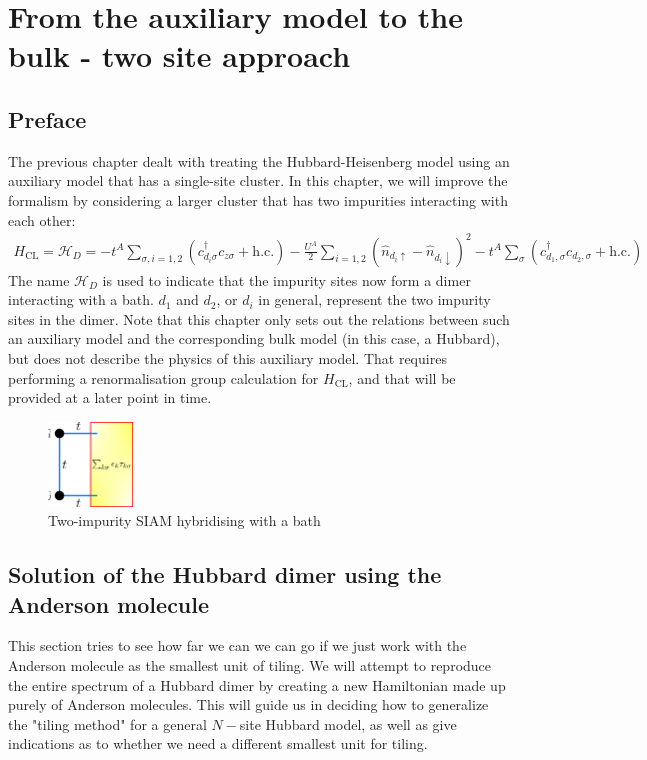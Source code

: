 \documentclass{report}
\numberwithin{equation}{section}
\begin{document}
\chapter{From the auxiliary model to the bulk - two site approach}

\section{Preface}
The previous chapter dealt with treating the Hubbard-Heisenberg model using an auxiliary model that has a single-site cluster. In this chapter, we will improve the formalism by considering a larger cluster that has two impurities interacting with each other:
\begin{equation}\begin{aligned}
	\label{dimer_ham}
	H_\text{CL} = \mathcal{H}_D = -t^A\sum_{\sigma, i=1,2}\left(c^\dagger_{d_i\sigma}c_{z\sigma} + \text{h.c.}\right) - \frac{U^A}{2}\sum_{i=1,2}\left(\hat n_{d_i \uparrow} - \hat n_{d_i \downarrow}\right)^2 - t^A \sum_\sigma \left(c^\dagger_{d_1,\sigma}c_{d_2,\sigma} + \text{h.c.}\right) 
\end{aligned}\end{equation}
The name \(\mathcal{H}_D\) is used to indicate that the impurity sites now form a dimer interacting with a bath. \(d_1\) and \(d_2\), or \(d_i\) in general, represent the two impurity sites in the dimer. Note that this chapter only sets out the relations between such an auxiliary model and the corresponding bulk model (in this case, a Hubbard), but does not describe the physics of this auxiliary model. That requires performing a renormalisation group calculation for \(H_\text{CL}\), and that will be provided at a later point in time.

\begin{figure}[htpb]
	\centering
	\includegraphics[width=0.2\textwidth]{../figures/dimer_dispersion.png}
	\caption{Two-impurity SIAM hybridising with a bath}
\end{figure}

\section{Solution of the Hubbard dimer using the Anderson molecule}
This section tries to see how far we can we can go if we just work with the Anderson molecule as the smallest unit of tiling. We will attempt to reproduce the entire spectrum of a Hubbard dimer by creating a new Hamiltonian made up purely of Anderson molecules. This will guide us in deciding how to generalize the "tiling method" for a general $N-$site Hubbard model, as well as give indications as to whether we need a different smallest unit for tiling.
\end{document}
